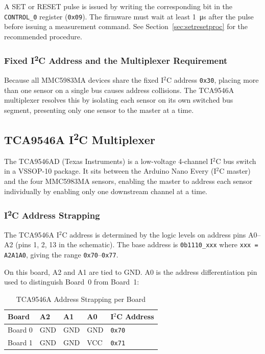 \documentclass[12pt]{article}
\begin{document}
A SET or RESET pulse is issued by writing the corresponding bit in the
\texttt{CONTROL\_0} register (\texttt{0x09}). The firmware must wait at
least \SI{1}{\micro\second} after the pulse before issuing a measurement
command. See Section~\ref{sec:setresetproc} for the recommended procedure.

\subsubsection{Fixed I\textsuperscript{2}C Address and the Multiplexer Requirement}

Because all MMC5983MA devices share the fixed I$^2$C address \texttt{0x30},
placing more than one sensor on a single bus causes address collisions.
The TCA9546A multiplexer resolves this by isolating each sensor on its own
switched bus segment, presenting only one sensor to the master at a time.

\subsection{TCA9546A I\textsuperscript{2}C Multiplexer}
\label{subsec:tca}

The TCA9546AD (Texas Instruments) is a low-voltage 4-channel I$^2$C bus
switch in a VSSOP-10 package. It sits between the Arduino Nano Every (I$^2$C
master) and the four MMC5983MA sensors, enabling the master to address each
sensor individually by enabling only one downstream channel at a time.

\subsubsection{I\textsuperscript{2}C Address Strapping}

The TCA9546A I$^2$C address is determined by the logic levels on address
pins A0--A2 (pins 1, 2, 13 in the schematic). The base address is
\texttt{0b1110\_xxx} where \texttt{xxx = A2A1A0}, giving the range
\texttt{0x70}--\texttt{0x77}.

On this board, A2 and A1 are tied to GND. A0 is the address differentiation
pin used to distinguish Board~0 from Board~1:

\begin{table}[H]
  \centering
  \caption{TCA9546A Address Strapping per Board}
  \begin{tabular}{lllll}
    \toprule
    \textbf{Board} & \textbf{A2} & \textbf{A1} & \textbf{A0} &
    \textbf{I$^2$C Address} \\
    \midrule
    Board 0 & GND & GND & GND & \texttt{0x70} \\
    Board 1 & GND & GND & VCC & \texttt{0x71} \\
    \bottomrule
  \end{tabular}
  \label{tab:tca_addr}
\end{table}
\end{document}
